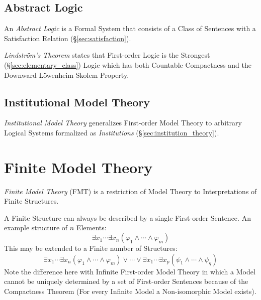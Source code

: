 \subsection{Abstract Logic}

An \emph{Abstract Logic} is a Formal System that consists of a Class
of Sentences with a Satisfaction Relation
(\S\ref{sec:satisfaction}).

\emph{Lindstr\"om's Theorem} states that First-order Logic is the
Strongest (\S\ref{sec:elementary_class}) Logic which has both
Countable Compactness and the Downward L\"owenheim-Skolem Property.



\subsection{Institutional Model Theory}

\emph{Institutional Model Theory} generalizes First-order Model Theory
to arbitrary Logical Systems formalized as \emph{Institutions}
(\S\ref{sec:institution_theory}).



\section{Finite Model Theory}

\emph{Finite Model Theory} (FMT) is a restriction of Model Theory to
Interpretations of Finite Structures.

A Finite Structure can always be described by a single First-order
Sentence. An example structure of $n$ Elements:
\[
    \exists x_1 \cdots \exists x_n ( \varphi_1 \wedge \cdots \wedge
    \varphi_m )
\]
This may be extended to a Finite number of Structures:
\[
    \exists x_1 \cdots \exists x_n ( \varphi_1 \wedge \cdots \wedge
    \varphi_m )
    \vee
    \cdots
    \vee
    \exists x_1 \cdots \exists x_p ( \psi_1 \wedge \cdots \wedge
    \psi_q )
\]
Note the difference here with Infinite First-order Model Theory in
which a Model cannot be uniquely determined by a set of First-order
Sentences because of the Compactness Theorem (For every Infinite Model
a Non-isomorphic Model exists).

